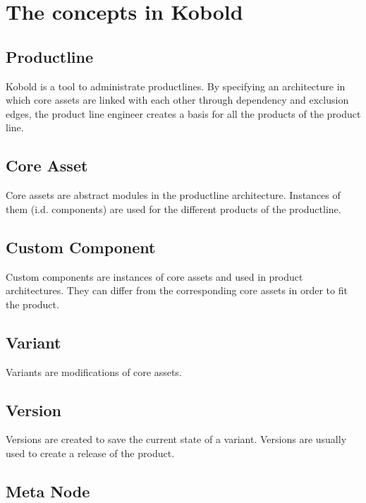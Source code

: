 \chapter{The concepts in Kobold}

\section{Productline}

Kobold is a tool to administrate productlines. By specifying an architecture in which
core assets are linked with each other through dependency and exclusion edges, the product line engineer
creates a basis for all the products of the product line. 

\section{Core Asset}

Core assets are abstract modules in the productline architecture. Instances of them (i.d. components)
are used for the different products of the productline.



\section{Custom Component}

Custom components are instances of core assets and used in product architectures. They can
differ from the corresponding core assets in order to fit the product.

\section{Variant}

Variants are modifications of core assets.

\section{Version}

Versions are created to save the current state of a variant. Versions are usually
used to create a release of the product.

\section{Meta Node}

